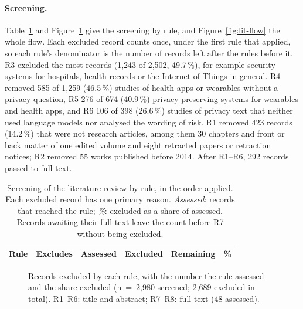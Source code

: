 \paragraph{Screening.} Table~\ref{tab:lit-screening} and
Figure~\ref{fig:lit-exclusions} give the screening by rule, and
Figure~\ref{fig:lit-flow} the whole flow. Each excluded record counts once,
under the first rule that applied, so each rule's denominator is the number of
records left after the rules before it. R3 excluded the most records (1{,}243
of 2{,}502, 49.7\,\%), for example security systems for hospitals, health
records or the Internet of Things in general. R4 removed 585 of 1{,}259 (46.5\,\%) studies of
health apps or wearables without a privacy question, R5 276 of 674 (40.9\,\%)
privacy-preserving systems for wearables and health apps, and R6 106 of 398
(26.6\,\%) studies of privacy text that neither used language models nor
analysed the wording of risk. R1 removed 423 records (14.2\,\%) that were not
research articles, among them 30 chapters and front or back matter of one
edited volume and eight retracted papers or retraction notices; R2 removed 55
works published before 2014. After R1--R6, 292 records passed to full text.

\begin{table}[tbp]
\centering
\begin{singlespace}
\caption[Screening of the literature review by rule]{Screening of the
literature review by rule, in the order applied. Each excluded record has one
primary reason. \emph{Assessed}: records that reached the rule; \emph{\%}:
excluded as a share of assessed. Records awaiting their full text leave the
count before R7 without being excluded.}
\label{tab:lit-screening}
\small
\begin{tabularx}{\textwidth}{@{}l>{\raggedright\arraybackslash}Xrrrr@{}}
\toprule
\textbf{Rule} & \textbf{Excludes} & \textbf{Assessed} & \textbf{Excluded} & \textbf{Remaining} & \textbf{\%} \\
\midrule
\end{tabularx}
\end{singlespace}
\end{table}

\begin{figure}[tbp]
\centering

\caption[Exclusions by rule]{Records excluded by each rule, with the number
the rule assessed and the share excluded (n~=~2{,}980 screened; 2{,}689
excluded in total). R1--R6: title and abstract; R7--R8: full text (48
assessed).}
\label{fig:lit-exclusions}
\end{figure}

